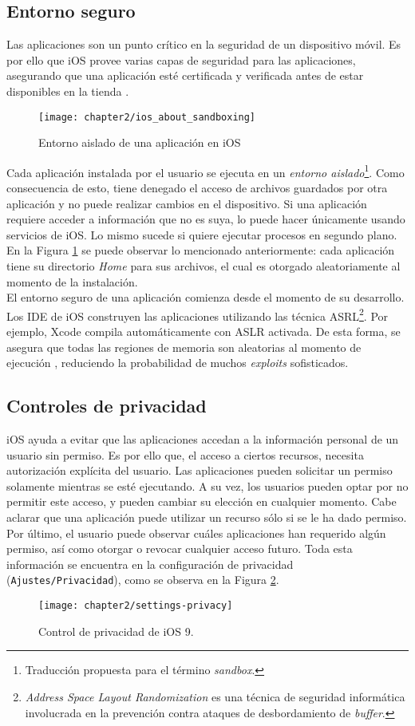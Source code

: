 \subsection{Entorno seguro}
Las aplicaciones son un punto crítico en la seguridad de un dispositivo móvil. Es por ello que iOS provee varias capas de seguridad para las aplicaciones, asegurando que una aplicación esté certificada y verificada antes de estar disponibles en la tienda \cite{asg}.\\
\begin{figure}[hbtp]
	\centering
	\texttt{[image: chapter2/ios\_about\_sandboxing]}
    \caption{Entorno aislado de una aplicación en iOS \cite{iosdl}} 
    \label{fig:ch02:sandboxing}
\end{figure}
Cada aplicación instalada por el usuario se ejecuta en un \emph{entorno aislado}\footnote{Traducción propuesta para el término \textit{sandbox}.}. Como consecuencia de esto, tiene denegado el acceso de archivos guardados por otra aplicación y no puede realizar cambios en el dispositivo. Si una aplicación requiere acceder a información que no es suya, lo puede hacer únicamente usando servicios de iOS. Lo mismo sucede si quiere ejecutar procesos en segundo plano. En la Figura \ref{fig:ch02:sandboxing} se puede observar lo mencionado anteriormente: cada aplicación tiene su directorio \textit{Home} para sus archivos, el cual es otorgado aleatoriamente al momento de la instalación.\\
El entorno seguro de una aplicación comienza desde el momento de su desarrollo. Los IDE de iOS construyen las aplicaciones utilizando las técnica ASRL\footnote{\textit{Address Space Layout Randomization} es una técnica de seguridad informática involucrada en la prevención contra ataques de desbordamiento de \textit{buffer}.}. Por ejemplo, Xcode compila automáticamente con ASLR activada. De esta forma, se asegura que todas las regiones de memoria son aleatorias al momento de ejecución \cite{asg}, reduciendo la probabilidad de muchos \textit{exploits} sofisticados.
\subsection{Controles de privacidad}
iOS ayuda a evitar que las aplicaciones accedan a la información personal de un usuario sin permiso. Es por ello que, el acceso a ciertos recursos, necesita autorización explícita del usuario. Las aplicaciones pueden solicitar un permiso solamente mientras se esté ejecutando. A su vez, los usuarios pueden optar por no permitir este acceso, y pueden cambiar su elección en cualquier momento. Cabe aclarar que una aplicación puede utilizar un recurso sólo si se le ha dado permiso.\\
Por último, el usuario puede observar cuáles aplicaciones han requerido algún permiso, así como otorgar o revocar cualquier acceso futuro. Toda esta información se encuentra en la configuración de privacidad (\texttt{Ajustes/Privacidad}), como se observa en la Figura \ref{fig:ch02:permissions-capture}.
\begin{figure}[hbtp]
    \centering
    \texttt{[image: chapter2/settings-privacy]}
    \caption{Control de privacidad de iOS 9.}
	\label{fig:ch02:permissions-capture}
\end{figure}
